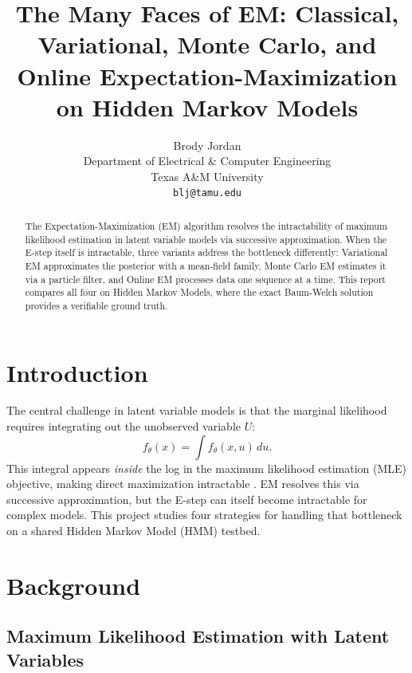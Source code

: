 \documentclass{article}
\title{The Many Faces of EM: Classical, Variational, Monte Carlo,
       and Online Expectation-Maximization on Hidden Markov Models}
\author{
  Brody Jordan \\
  Department of Electrical \& Computer Engineering \\
  Texas A\&M University \\
  \texttt{blj@tamu.edu}
}
\begin{document}
\maketitle

\begin{abstract}
  The Expectation-Maximization (EM) algorithm resolves the intractability of
  maximum likelihood estimation in latent variable models via successive
  approximation. When the E-step itself is intractable, three variants address
  the bottleneck differently: Variational EM approximates the posterior with a
  mean-field family, Monte Carlo EM estimates it via a particle filter, and
  Online EM processes data one sequence at a time. This report compares all four
  on Hidden Markov Models, where the exact Baum-Welch solution provides a
  verifiable ground truth.
\end{abstract}

\section{Introduction}

The central challenge in latent variable models is that the marginal
likelihood requires integrating out the unobserved variable $U$:
\begin{equation}
  f_\theta(x) = \int f_\theta(x, u)\, du.
  \label{eq:marginal}
\end{equation}
This integral appears \emph{inside} the log in the maximum likelihood estimation (MLE) objective, making
direct maximization intractable \citep{liu_ecen662_em}. EM resolves this via
successive approximation, but the E-step can itself become intractable for
complex models. This project studies four strategies for handling that
bottleneck on a shared Hidden Markov Model (HMM) testbed.

\section{Background}

\subsection{Maximum Likelihood Estimation with Latent Variables}
\end{document}
